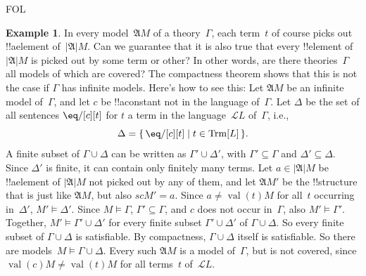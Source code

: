 \documentclass[10pt,a4paper]{article}
\theoremstyle{plain}
\theoremstyle{definition}
\newtheorem{ex}[thm]{Example}
\theoremstyle{remark}
\providecommand{\Struct}{\ensuremath{\mathfrak{A}}}
\providecommand{\Domain}{\ensuremath{|\mathfrak{A}|}}
\providecommand{\Assign}{\ensuremath{s}}
\providecommand{\Sat}[2]{\ensuremath{#1 \models #2}}
\providecommand{\Lang}{\ensuremath{\mathcal{L}}}
\providecommand{\iftag}[1]{#1}
\providecommand{\Setabs}[2]{\{\, #1 \mid #2 \,\}}
\providecommand{\Value}[1]{\operatorname{val}(#1)}
\providecommand{\Trm}{\mathrm{Trm}}
\begin{document}
\iftag{FOL}{%
\begin{ex}
In every model~$\Struct{M}$ of a theory~$\Gamma$, each term~$t$ of
course picks out !!a{element} of~$\Domain{M}$. Can we guarantee that
it is also true that every !!{element} of~$\Domain{M}$ is picked out
by some term or other? In other words, are there theories~$\Gamma$ all
models of which are covered?  The compactness theorem shows that this
is not the case if $\Gamma$ has infinite models. Here's how to see
this: Let $\Struct{M}$ be an infinite model of~$\Gamma$, and let $c$
be !!a{constant} not in the language of~$\Gamma$. Let $\Delta$ be the
set of all sentences $\eq/[c][t]$ for $t$ a term in the
language~$\Lang{L}$ of~$\Gamma$, i.e.,
  \[
  \Delta = \Setabs{\eq/[c][t]}{t \in \Trm[L]}.
  \]
A finite subset of $\Gamma \cup \Delta$ can be written as $\Gamma'
\cup \Delta'$, with $\Gamma' \subseteq \Gamma$ and $\Delta' \subseteq
\Delta$. Since $\Delta'$ is finite, it can contain only finitely many
terms. Let $a \in \Domain{M}$ be !!a{element} of $\Domain{M}$ not
picked out by any of them, and let $\Struct{M'}$ be the !!{structure}
that is just like $\Struct{M}$, but also $\Assign{c}{M'} = a$. Since
$a \neq \Value{t}{M}$ for all~$t$ occurring in~$\Delta'$,
$\Sat{M'}{\Delta'}$. Since $\Sat{M}{\Gamma}$, $\Gamma' \subseteq
\Gamma$, and $c$ does not occur in~$\Gamma$, also
$\Sat{M'}{\Gamma'}$. Together, $\Sat{M'}{\Gamma' \cup \Delta'}$ for
every finite subset $\Gamma' \cup \Delta'$ of $\Gamma \cup \Delta$. So
every finite subset of $\Gamma \cup \Delta$ is satisfiable. By
compactness, $\Gamma \cup \Delta$ itself is satisfiable. So there are
models~$\Sat{M}{\Gamma \cup \Delta}$. Every such $\Struct{M}$ is a
model of~$\Gamma$, but is not covered, since $\Value{c}{M} \neq
\Value{t}{M}$ for all terms~$t$ of~$\Lang{L}$.
\end{ex}

}
\end{document}
